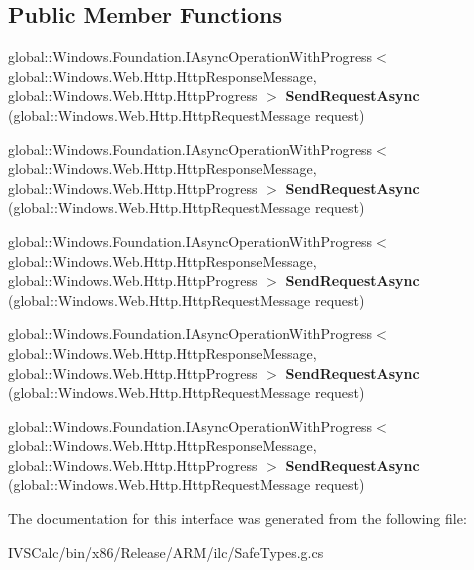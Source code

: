 \subsection*{Public Member Functions}
\begin{DoxyCompactItemize}
\item 
\mbox{\label{interface_windows_1_1_web_1_1_http_1_1_i_http_client_a882c0e628239a8042553cf38ebb999ae}} 
global\+::\+Windows.\+Foundation.\+I\+Async\+Operation\+With\+Progress$<$ global\+::\+Windows.\+Web.\+Http.\+Http\+Response\+Message, global\+::\+Windows.\+Web.\+Http.\+Http\+Progress $>$ {\bfseries Send\+Request\+Async} (global\+::\+Windows.\+Web.\+Http.\+Http\+Request\+Message request)
\item 
\mbox{\label{interface_windows_1_1_web_1_1_http_1_1_i_http_client_a882c0e628239a8042553cf38ebb999ae}} 
global\+::\+Windows.\+Foundation.\+I\+Async\+Operation\+With\+Progress$<$ global\+::\+Windows.\+Web.\+Http.\+Http\+Response\+Message, global\+::\+Windows.\+Web.\+Http.\+Http\+Progress $>$ {\bfseries Send\+Request\+Async} (global\+::\+Windows.\+Web.\+Http.\+Http\+Request\+Message request)
\item 
\mbox{\label{interface_windows_1_1_web_1_1_http_1_1_i_http_client_a882c0e628239a8042553cf38ebb999ae}} 
global\+::\+Windows.\+Foundation.\+I\+Async\+Operation\+With\+Progress$<$ global\+::\+Windows.\+Web.\+Http.\+Http\+Response\+Message, global\+::\+Windows.\+Web.\+Http.\+Http\+Progress $>$ {\bfseries Send\+Request\+Async} (global\+::\+Windows.\+Web.\+Http.\+Http\+Request\+Message request)
\item 
\mbox{\label{interface_windows_1_1_web_1_1_http_1_1_i_http_client_a882c0e628239a8042553cf38ebb999ae}} 
global\+::\+Windows.\+Foundation.\+I\+Async\+Operation\+With\+Progress$<$ global\+::\+Windows.\+Web.\+Http.\+Http\+Response\+Message, global\+::\+Windows.\+Web.\+Http.\+Http\+Progress $>$ {\bfseries Send\+Request\+Async} (global\+::\+Windows.\+Web.\+Http.\+Http\+Request\+Message request)
\item 
\mbox{\label{interface_windows_1_1_web_1_1_http_1_1_i_http_client_a882c0e628239a8042553cf38ebb999ae}} 
global\+::\+Windows.\+Foundation.\+I\+Async\+Operation\+With\+Progress$<$ global\+::\+Windows.\+Web.\+Http.\+Http\+Response\+Message, global\+::\+Windows.\+Web.\+Http.\+Http\+Progress $>$ {\bfseries Send\+Request\+Async} (global\+::\+Windows.\+Web.\+Http.\+Http\+Request\+Message request)
\end{DoxyCompactItemize}


The documentation for this interface was generated from the following file\+:\begin{DoxyCompactItemize}
\item 
I\+V\+S\+Calc/bin/x86/\+Release/\+A\+R\+M/ilc/Safe\+Types.\+g.\+cs\end{DoxyCompactItemize}
